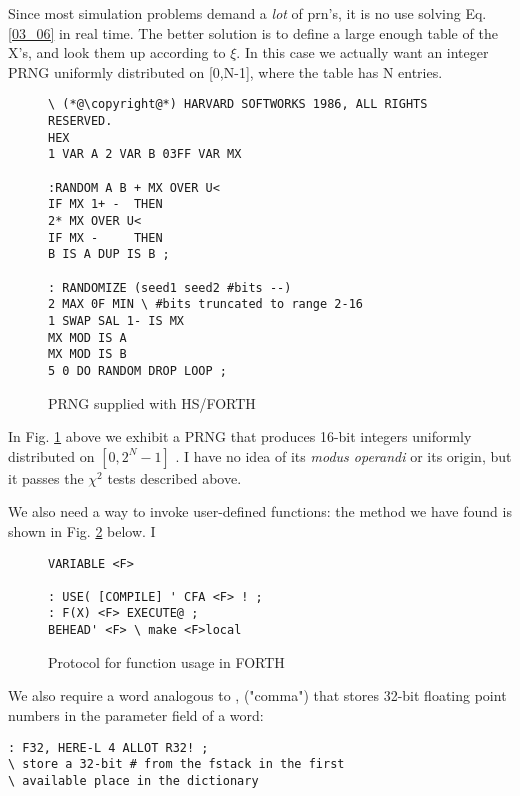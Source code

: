 Since most simulation problems demand a \textit{lot} of prn's, it is no use
solving Eq. \ref{03_06} in real time. The better solution is to define a large
enough table of the X's, and look them up according to $\xi$. In this
case we actually want an integer PRNG uniformly distributed on
[0,N-1], where the table has N entries.

\begin{figure}
    \label{fig:03_03}
    \begin{mdframed}
        \begin{lstlisting}
\ (*@\copyright@*) HARVARD SOFTWORKS 1986, ALL RIGHTS RESERVED.
HEX
1 VAR A 2 VAR B 03FF VAR MX

:RANDOM A B + MX OVER U<
IF MX 1+ -  THEN
2* MX OVER U<
IF MX -     THEN
B IS A DUP IS B ;

: RANDOMIZE (seed1 seed2 #bits --)
2 MAX 0F MIN \ #bits truncated to range 2-16
1 SWAP SAL 1- IS MX
MX MOD IS A
MX MOD IS B
5 0 DO RANDOM DROP LOOP ;
        \end{lstlisting}
    \end{mdframed}
    \caption{PRNG supplied with HS/FORTH}
\end{figure}

In Fig. \ref{fig:03_03}  above we exhibit a PRNG that produces 16-bit integers
uniformly distributed on $[0, 2^N-1]$ . I have no idea of its \textit{modus
operandi} or its origin, but it passes the $\chi^2$ tests described above.

We also need a way to invoke user-defined functions: the method
we have found is shown in Fig. \ref{fig:03_04} below. I

\begin{figure}
    \label{fig:03_04}
    \begin{mdframed}
        \begin{lstlisting}
VARIABLE <F>

: USE( [COMPILE] ' CFA <F> ! ;
: F(X) <F> EXECUTE@ ;
BEHEAD' <F> \ make <F>local
        \end{lstlisting}
    \end{mdframed}
    \caption{Protocol for function usage in FORTH
}
\end{figure}

We also require a word analogous to , ("comma") that stores
32-bit floating point numbers in the parameter field of a word:

\begin{verbatim}
: F32, HERE-L 4 ALLOT R32! ;
\ store a 32-bit # from the fstack in the first
\ available place in the dictionary
\end{verbatim}

